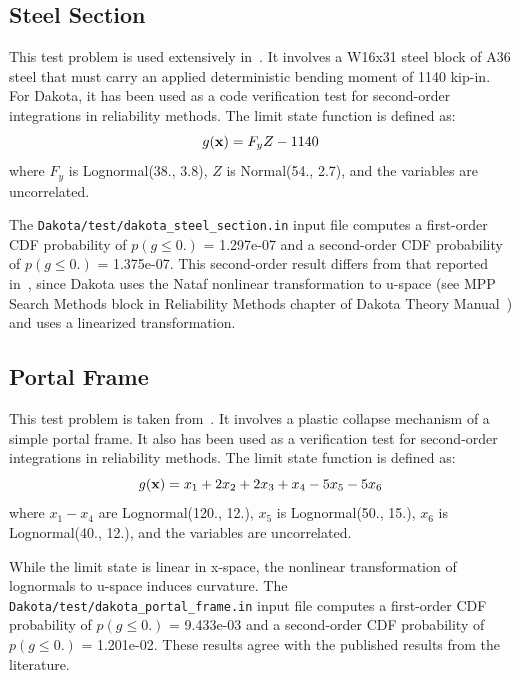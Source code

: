 \subsection{Steel Section}\label{additional:steel_section}

This test problem is used extensively in~\cite{Hal00}. It involves a
W16x31 steel block of A36 steel that must carry an applied
deterministic bending moment of 1140 kip-in. For Dakota, it has been
used as a code verification test for second-order integrations in
reliability methods. The limit state function is defined as:
\begin{equation}
g({\bf x}) = F_y Z - 1140
\end{equation}
where $F_y$ is Lognormal(38., 3.8), $Z$ is Normal(54., 2.7), and the
variables are uncorrelated.

The \texttt{Dakota/test/dakota\_steel\_section.in} input file computes
a first-order CDF probability of $p(g \leq 0.)$ = 1.297e-07 and a
second-order CDF probability of $p(g \leq 0.)$ = 1.375e-07. This
second-order result differs from that reported in~\cite{Hal00}, since
Dakota uses the Nataf nonlinear transformation to u-space (see MPP
Search Methods block in Reliability Methods chapter of Dakota Theory
Manual~\cite{TheoMan}) and \cite{Hal00} uses a linearized
transformation.

\subsection{Portal Frame}\label{additional:portal_frame}


This test problem is taken from~\cite{Tve90,Hon99}. It involves a
plastic collapse mechanism of a simple portal frame. It also has been
used as a verification test for second-order integrations in 
reliability methods. The limit state function is defined as:
\begin{equation}
g({\bf x}) = x_1 + 2 x_2 + 2 x_3 + x_4 - 5 x_5 - 5 x_6
\end{equation}
where $x_1 - x_4$ are Lognormal(120., 12.), $x_5$ is Lognormal(50.,
15.), $x_6$ is Lognormal(40., 12.), and the variables are uncorrelated.

While the limit state is linear in x-space, the nonlinear
transformation of lognormals to u-space induces curvature. The
\texttt{Dakota/test/dakota\_portal\_frame.in} input file computes a
first-order CDF probability of $p(g \leq 0.)$ = 9.433e-03 and a
second-order CDF probability of $p(g \leq 0.)$ = 1.201e-02. These
results agree with the published results from the literature.

